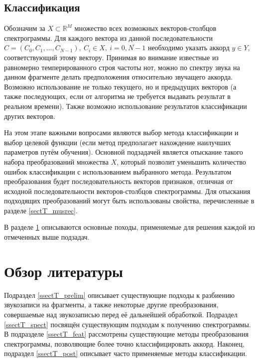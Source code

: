 \subsection{Классификация}

Обозначим за $X \subset \mathbb{R}^M$ множество всех возможных векторов-столбцов
спектрограммы. Для каждого вектора из данной последовательности $C = (C_0, C_1,
\ldots, C_{N-1}),~C_i \in X,~i=\overline{0,N-1}$ необходимо указать аккорд $y
\in Y$, соответствующий этому вектору. Принимая во внимание известные из
равномерно темперированного строя частоты нот, можно по спектру звука на данном
фрагменте делать предположения относительно звучащего аккорда. Возможно
использование не только текущего, но и предыдущих векторов (а также
последующих, если от алгоритма не требуется выдавать результат в реальном
времени). Также возможно использование результатов классификации других
векторов.

На этом этапе важными вопросами являются выбор метода классификации и выбор
целевой функции (если метод предполагает нахождение наилучших параметров путём
обучения). Основной подзадачей является отыскание такого набора преобразований
множества $X$, который позволит уменьшить количество ошибок классификации с
использованием выбранного метода. Результатом преобразования будет
последовательность векторов признаков, отличная от исходной последовательности
векторов-столбцов спектрограммы. Для отыскания подходящих преобразований могут
быть использованы свойства, перечисленные в разделе \ref{sectT_musrec}.

В разделе \ref{sectT_lit} описываются основные походы, применяемые для решения
каждой из отмеченных выше подзадач.

\section{Обзор литературы} \label{sectT_lit}

Подраздел \ref{ssectT_prelim} описывает существующие подходы к разбиению
звукозаписи на фрагменты, а также некоторые другие преобразования, совершаемые
над звукозаписью перед её дальнейшей обработкой. Подраздел \ref{ssectT_spect}
посвящён существующим подходам к получению спектрограммы. В подразделе
\ref{ssectT_feat} рассмотрены существующие методы преобразования спектрограммы,
позволяющие более точно классифицировать аккорд. Наконец, подраздел
\ref{ssectT_post} описывает часто применяемые методы классификации.

% 

